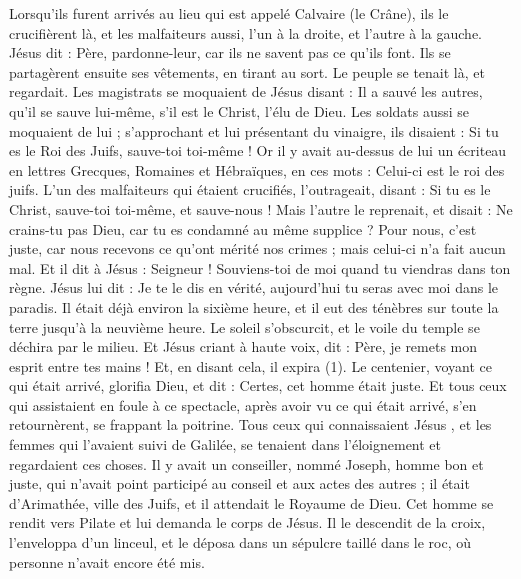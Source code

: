 \begin{multicols}{2}
Lorsqu’ils furent arrivés au lieu qui est appelé Calvaire (le Crâne), ils le crucifièrent là, et les malfaiteurs aussi, l'un à la droite, et l'autre à la gauche.
Jésus dit : Père, pardonne-leur, car ils ne savent pas ce qu'ils font. Ils se partagèrent ensuite ses vêtements, en tirant au sort.
Le peuple se tenait là, et regardait. Les magistrats se moquaient de Jésus disant : Il a sauvé les autres, qu'il se sauve lui-même, s'il est le Christ, l'élu de Dieu.
Les soldats aussi se moquaient de lui ; s'approchant et lui présentant du vinaigre,
ils disaient : Si tu es le Roi des Juifs, sauve-toi toi-même !
Or il y avait au-dessus de lui un écriteau en lettres Grecques, Romaines et Hébraïques, en ces mots : Celui-ci est le roi des juifs.
L’un des malfaiteurs qui étaient crucifiés, l'outrageait, disant : Si tu es le Christ, sauve-toi toi-même, et sauve-nous !
Mais l'autre le reprenait, et disait : Ne crains-tu pas Dieu, car tu es condamné au même supplice ?
Pour nous, c’est juste, car nous recevons ce qu’ont mérité nos crimes ; mais celui-ci n’a fait aucun mal.
Et il dit à Jésus : Seigneur ! Souviens-toi de moi quand tu viendras dans ton règne.
Jésus lui dit : Je te le dis en vérité, aujourd'hui tu seras avec moi dans le paradis.
Il était déjà environ la sixième heure, et il eut des ténèbres sur toute la terre jusqu'à la neuvième heure.
Le soleil s’obscurcit, et le voile du temple se déchira par le milieu.
Et Jésus criant à haute voix, dit : Père, je remets mon esprit entre tes mains ! Et, en disant cela, il expira (1).
Le centenier, voyant ce qui était arrivé, glorifia Dieu, et dit : Certes, cet homme était juste.
Et tous ceux qui assistaient en foule à ce spectacle, après avoir vu ce qui était arrivé, s'en retournèrent, se frappant la poitrine.
Tous ceux qui connaissaient Jésus , et les femmes qui l'avaient suivi de Galilée, se tenaient dans l’éloignement et regardaient ces choses.
Il y avait un conseiller, nommé Joseph, homme bon et juste,
qui n'avait point participé au conseil et aux actes des autres ; il était d'Arimathée, ville des Juifs, et il attendait le Royaume de Dieu.
Cet homme se rendit vers Pilate et lui demanda le corps de Jésus.
Il le descendit de la croix, l'enveloppa d’un linceul, et le déposa dans un sépulcre taillé dans le roc, où personne n'avait encore été mis.

\end{multicols}

